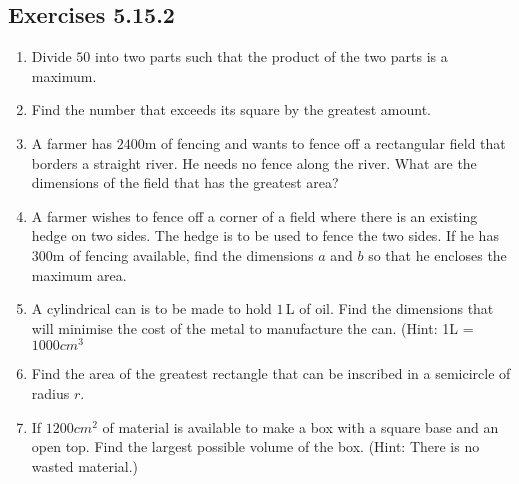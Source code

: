 \subsection{Exercises 5.15.2}
\begin{enumerate}
	\item Divide $50$ into two parts such that the product of the two parts is a maximum. 
	
	\item Find
	the number that exceeds its square by the greatest amount. 
	
	\item A farmer has $2400 \mbox{m}$ of fencing and wants to fence off a rectangular field that borders a straight
	river. He needs no fence along the river. What are the dimensions
	of the field that has the greatest area? 
	
	\item A farmer wishes to fence off a corner of a field where
	there is an existing hedge on two sides. The hedge is to be used to fence the two sides. If
	he has $300 \mbox{m}$ of fencing available, find the dimensions $a$ and $b$ so that he encloses the maximum area. \\\relax    
	\setlength\fboxrule{0in}\setlength\fboxsep{0.2in}
	
	
	\item A cylindrical can is to be made to hold $1\,$L of oil. Find the dimensions that will minimise the cost of the
	metal to manufacture the can. (Hint: 1\thinspace L = $1000 cm^{3}$ 
	
	\item Find the area of the greatest rectangle that can be inscribed in a semicircle
	of radius $r$. 
	
	\item If $1200 cm^{2}$ of material is available to make a box with a square base and an open top. Find the largest
	possible volume of the box. (Hint: There is no wasted material.) \end{enumerate}